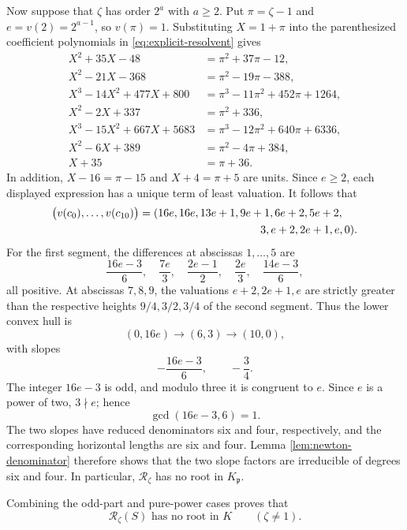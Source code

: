 Now suppose that $\zeta$ has order $2^a$ with $a\ge2$.  Put
$\pi=\zeta-1$ and $e=v(2)=2^{a-1}$, so $v(\pi)=1$.  Substituting
$X=1+\pi$ into the parenthesized coefficient polynomials in
\eqref{eq:explicit-resolvent} gives
\begin{align*}
 X^2+35X-48&=\pi^2+37\pi-12,\\
 X^2-21X-368&=\pi^2-19\pi-388,\\
 X^3-14X^2+477X+800&=\pi^3-11\pi^2+452\pi+1264,\\
 X^2-2X+337&=\pi^2+336,\\
 X^3-15X^2+667X+5683&=\pi^3-12\pi^2+640\pi+6336,\\
 X^2-6X+389&=\pi^2-4\pi+384,\\
 X+35&=\pi+36.
\end{align*}
In addition, $X-16=\pi-15$ and $X+4=\pi+5$ are units.  Since $e\ge2$,
each displayed expression has a unique term of least valuation.  It
follows that
\begin{align}
 \bigl(v(c_0),\ldots,v(c_{10})\bigr)
={}&(16e,16e,13e+1,9e+1,6e+2,5e+2,\notag\\
&\hspace{34mm}3,e+2,2e+1,e,0).
\label{eq:pure-res-valuations}
\end{align}
For the first segment, the differences at abscissas $1,\ldots,5$ are
\[
 \frac{16e-3}{6},\quad\frac{7e}{3},\quad
 \frac{2e-1}{2},\quad\frac{2e}{3},\quad
 \frac{14e-3}{6},
\]
all positive.  At abscissas $7,8,9$, the valuations $e+2,2e+1,e$ are
strictly greater than the respective heights $9/4,3/2,3/4$ of the
second segment.  Thus the lower convex hull is
\[
 (0,16e)\longrightarrow(6,3)\longrightarrow(10,0),
\]
with slopes
\[
 -\frac{16e-3}{6},\qquad -\frac34.
\]
The integer $16e-3$ is odd, and modulo three it is congruent to $e$.
Since $e$ is a power of two, $3\nmid e$; hence
\[
 \gcd(16e-3,6)=1.
\]
The two slopes have reduced denominators six and four, respectively,
and the corresponding horizontal lengths are six and four.  Lemma
\ref{lem:newton-denominator} therefore shows that the two slope factors
are irreducible of degrees six and four.  In particular,
$\mathcal R_\zeta$ has no root in $K_{\mathfrak p}$.

Combining the odd-part and pure-power cases proves that
\begin{equation}\label{eq:res-no-K-root}
 \mathcal R_\zeta(S)\text{ has no root in }K
 \qquad(\zeta\ne1).
\end{equation}
